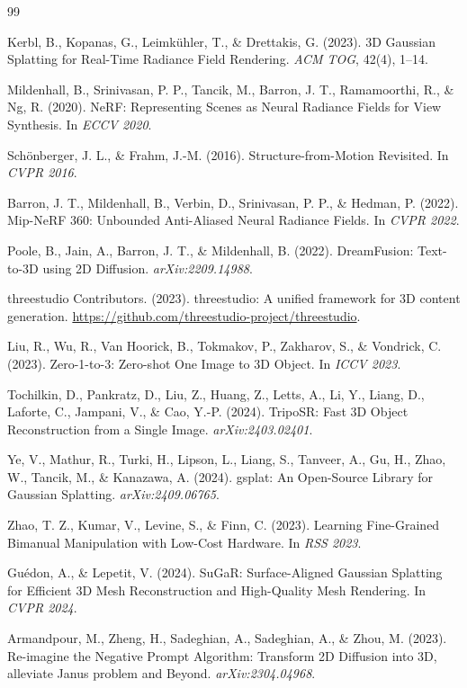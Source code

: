 \documentclass{article}
\begin{document}

\begin{thebibliography}{99}

Kerbl, B., Kopanas, G., Leimk{\"u}hler, T., \& Drettakis, G. (2023).
3D Gaussian Splatting for Real-Time Radiance Field Rendering.
\textit{ACM TOG}, 42(4), 1--14.

Mildenhall, B., Srinivasan, P. P., Tancik, M., Barron, J. T., Ramamoorthi, R.,
\& Ng, R. (2020). NeRF: Representing Scenes as Neural Radiance Fields for View
Synthesis. In \textit{ECCV 2020}.

Sch{\"o}nberger, J. L., \& Frahm, J.-M. (2016). Structure-from-Motion Revisited.
In \textit{CVPR 2016}.

Barron, J. T., Mildenhall, B., Verbin, D., Srinivasan, P. P., \& Hedman, P.
(2022). Mip-NeRF 360: Unbounded Anti-Aliased Neural Radiance Fields.
In \textit{CVPR 2022}.

Poole, B., Jain, A., Barron, J. T., \& Mildenhall, B. (2022).
DreamFusion: Text-to-3D using 2D Diffusion.
\textit{arXiv:2209.14988}.

threestudio Contributors. (2023).
threestudio: A unified framework for 3D content generation.
\url{https://github.com/threestudio-project/threestudio}.

Liu, R., Wu, R., Van Hoorick, B., Tokmakov, P., Zakharov, S., \& Vondrick, C.
(2023). Zero-1-to-3: Zero-shot One Image to 3D Object.
In \textit{ICCV 2023}.

Tochilkin, D., Pankratz, D., Liu, Z., Huang, Z., Letts, A., Li, Y.,
Liang, D., Laforte, C., Jampani, V., \& Cao, Y.-P. (2024).
TripoSR: Fast 3D Object Reconstruction from a Single Image.
\textit{arXiv:2403.02401}.

Ye, V., Mathur, R., Turki, H., Lipson, L., Liang, S., Tanveer, A.,
Gu, H., Zhao, W., Tancik, M., \& Kanazawa, A. (2024).
gsplat: An Open-Source Library for Gaussian Splatting.
\textit{arXiv:2409.06765}.

Zhao, T. Z., Kumar, V., Levine, S., \& Finn, C. (2023).
Learning Fine-Grained Bimanual Manipulation with Low-Cost Hardware.
In \textit{RSS 2023}.

Gu{\'e}don, A., \& Lepetit, V. (2024).
SuGaR: Surface-Aligned Gaussian Splatting for Efficient 3D Mesh Reconstruction
and High-Quality Mesh Rendering. In \textit{CVPR 2024}.

Armandpour, M., Zheng, H., Sadeghian, A., Sadeghian, A., \& Zhou, M. (2023).
Re-imagine the Negative Prompt Algorithm: Transform 2D Diffusion into 3D,
alleviate Janus problem and Beyond.
\textit{arXiv:2304.04968}.

\end{thebibliography}
\end{document}
